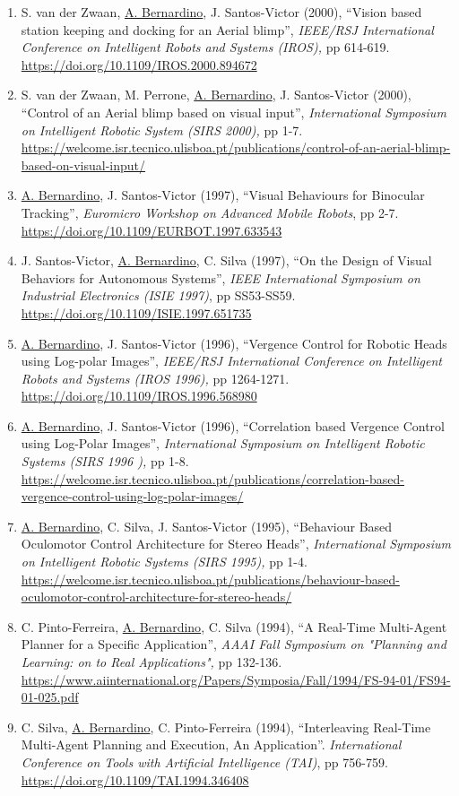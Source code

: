 \begin{enumerate}
\item
  S. van der Zwaan, \ul{A. Bernardino}, J. Santos-Victor (2000),
  ``Vision based station keeping and docking for an Aerial blimp'',
  \emph{IEEE/RSJ International Conference on Intelligent Robots and
  Systems (IROS),} pp 614-619.
  \url{https://doi.org/10.1109/IROS.2000.894672}~
\item
  S. van der Zwaan, M. Perrone, \ul{A. Bernardino}, J. Santos-Victor
  (2000), ``Control of an Aerial blimp based on visual input'',
  \emph{International Symposium on Intelligent Robotic System (SIRS
  2000),} pp 1-7.
  \url{https://welcome.isr.tecnico.ulisboa.pt/publications/control-of-an-aerial-blimp-based-on-visual-input/}~
\item
  \ul{A. Bernardino}, J. Santos-Victor (1997), ``Visual Behaviours for
  Binocular Tracking'', \emph{Euromicro Workshop on Advanced Mobile
  Robots}, pp 2-7. \url{https://doi.org/10.1109/EURBOT.1997.633543}
\item
  J. Santos-Victor, \ul{A. Bernardino}, C. Silva (1997), ``On the Design
  of Visual Behaviors for Autonomous Systems'', \emph{IEEE International
  Symposium on Industrial Electronics (ISIE 1997)}, pp SS53-SS59.
  \url{https://doi.org/10.1109/ISIE.1997.651735} ~
\item
  \ul{A. Bernardino}, J. Santos-Victor (1996), ``Vergence Control for
  Robotic Heads using Log-polar Images'', \emph{IEEE/RSJ International
  Conference on Intelligent Robots and Systems (IROS 1996),} pp
  1264-1271. \url{https://doi.org/10.1109/IROS.1996.568980}~
\item
  \ul{A. Bernardino}, J. Santos-Victor (1996), ``Correlation based
  Vergence Control using Log-Polar Images'', \emph{International
  Symposium on Intelligent Robotic Systems (SIRS 1996 ),} pp 1-8.
  \url{https://welcome.isr.tecnico.ulisboa.pt/publications/correlation-based-vergence-control-using-log-polar-images/}~
\item
  \ul{A. Bernardino}, C. Silva, J. Santos-Victor (1995), ``Behaviour
  Based Oculomotor Control Architecture for Stereo Heads'',
  \emph{International Symposium on Intelligent Robotic Systems (SIRS
  1995),} pp 1-4.
  \url{https://welcome.isr.tecnico.ulisboa.pt/publications/behaviour-based-oculomotor-control-architecture-for-stereo-heads/}~
\item
  C. Pinto-Ferreira, \ul{A. Bernardino}, C. Silva (1994), ``A Real-Time
  Multi-Agent Planner for a Specific Application'', \emph{AAAI Fall
  Symposium on "Planning and Learning: on to Real Applications",} pp
  132-136.
  \url{https://www.aiinternational.org/Papers/Symposia/Fall/1994/FS-94-01/FS94-01-025.pdf}
\item
  C. Silva, \ul{A. Bernardino}, C. Pinto-Ferreira (1994), ``Interleaving
  Real-Time Multi-Agent Planning and Execution, An Application''.
  \emph{International Conference on Tools with Artificial Intelligence
  (TAI)}, pp 756-759. \url{https://doi.org/10.1109/TAI.1994.346408}
\end{enumerate}

